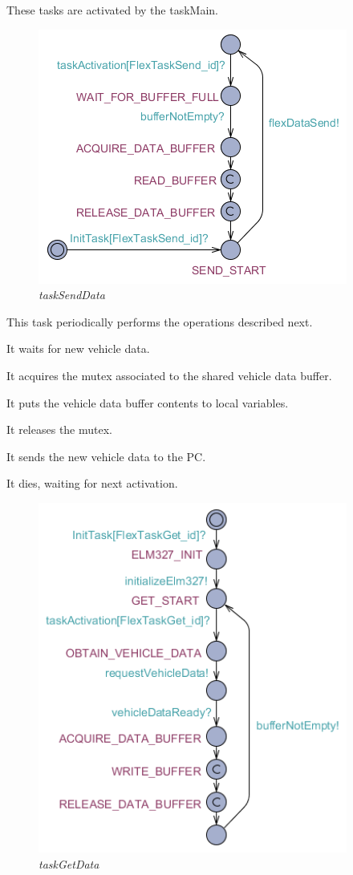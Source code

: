 \documentclass[paper=a4, fontsize=11pt]{scrartcl} %
\numberwithin{equation}{section} %
\numberwithin{figure}{section} %
\numberwithin{table}{section} %
\begin{document}
These tasks are activated by the taskMain.

\begin{figure}[H]
  \centering
  \includegraphics[width=4in]{img/FLEX-PC_taskSendData}
  \caption{\textit{taskSendData}}
\end{figure}

This task periodically performs the operations described next.

It waits for new vehicle data.

It acquires the mutex associated to the shared vehicle data buffer.

It puts the vehicle data buffer contents to local variables.

It releases the mutex.

It sends the new vehicle data to the PC.

It dies, waiting for next activation.

\begin{figure}[H]
  \centering
  \includegraphics[width=4in]{img/FLEX-PC_taskGetData}
  \caption{\textit{taskGetData}}
\end{figure}
\end{document}
